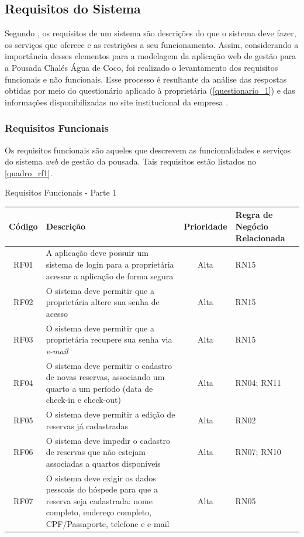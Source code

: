 \documentclass[
	12pt,				%
	openany,			%
	twoside,			%
	a4paper,			%
	english,			%
	french,				%
	spanish,			%
	brazil				%
	]{abntex2}
\begin{document}
\subsection{Requisitos do Sistema}
Segundo \cite[p. 57]{somerville2011}, os requisitos de um sistema são descrições do que o sistema deve fazer, os serviços que oferece e as restrições a seu funcionamento. Assim, considerando a importância desses elementos para a modelagem da aplicação web de gestão para a Pousada Chalés Água de Coco, foi realizado o levantamento dos requisitos funcionais e não funcionais. Esse processo é resultante da análise das respostas obtidas por meio do questionário aplicado à proprietária (\autoref{questionario_1}) e das informações disponibilizadas no site institucional da empresa \cite{pousada_chales_agua_de_coco}.
\subsubsection{Requisitos Funcionais}
Os requisitos funcionais são aqueles que descrevem as funcionalidades e serviços do sistema \textit{web} de gestão da pousada. Tais requisitos estão listados no \autoref{quadro_rf1}.

\begin{quadro}[H]
	\caption{Requisitos Funcionais - Parte 1}
	\label{quadro_rf1}
	\begin{tabular}{|c|p{5cm}|c|p{4cm}|}
		\hline
		\textbf{Código} & \textbf{Descrição} & \textbf{Prioridade} & \textbf{Regra de Negócio Relacionada} \\ \hline
		RF01 & A aplicação deve possuir um sistema de login para a proprietária acessar a aplicação de forma segura & Alta & RN15 \\ \hline
		RF02 & O sistema deve permitir que a proprietária altere sua senha de acesso  & Alta & RN15 \\ \hline
		RF03 & O sistema deve permitir que a proprietária recupere sua senha via \textit{e-mail} & Alta & RN15 \\ \hline
		RF04 & O sistema deve permitir o cadastro de novas reservas, associando um quarto a um período (data de check-in e check-out) & Alta & RN04; RN11 \\ \hline
		RF05 & O sistema deve permitir a edição de reservas já cadastradas & Alta & RN02 \\ \hline
		RF06 & O sistema deve impedir o cadastro de reservas que não estejam associadas a quartos disponíveis & Alta & RN07; RN10 \\ \hline
		RF07 & O sistema deve exigir os dados pessoais do hóspede para que a reserva seja cadastrada: nome completo, endereço completo, CPF/Passaporte, telefone e e-mail & Alta & RN05 \\ \hline
	\end{tabular}
\end{quadro}
\end{document}
